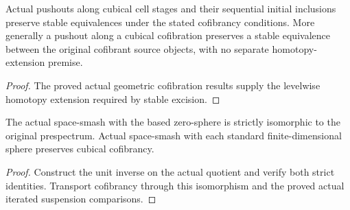 \begin{proposition}
  \label{prop:actual-cubical-stable-pushouts}
  \leanok
  Actual pushouts along cubical cell stages and their sequential initial inclusions preserve stable equivalences under the stated cofibrancy conditions. More generally a pushout along a cubical cofibration preserves a stable equivalence between the original cofibrant source objects, with no separate homotopy-extension premise.
\end{proposition}
\begin{proof}
  The proved actual geometric cofibration results supply the levelwise homotopy extension required by stable excision.
  \leanok
\end{proof}

\begin{proposition}
  \label{prop:actual-cofibrant-sphere-smash}
  \leanok
  The actual space-smash with the based zero-sphere is strictly isomorphic to the original prespectrum. Actual space-smash with each standard finite-dimensional sphere preserves cubical cofibrancy.
\end{proposition}
\begin{proof}
  Construct the unit inverse on the actual quotient and verify both strict identities. Transport cofibrancy through this isomorphism and the proved actual iterated suspension comparisons.
  \leanok
\end{proof}

